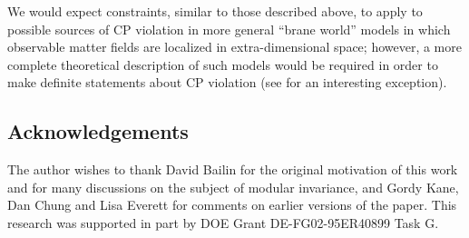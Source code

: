 \documentclass[a4paper,12pt]{article}
\begin{document}
We would expect constraints, similar to those described above, to apply to possible sources of CP violation in more general ``brane world'' models in which observable matter fields are localized in extra-dimensional space; however, a more complete theoretical description of such models would be required in order to make definite statements about CP violation (see \cite{Sakamura:2000ik} for an interesting exception).

\subsection*{Acknowledgements}
The author wishes to thank David Bailin for the original motivation of this work and for many discussions on the subject of modular invariance, and Gordy Kane, Dan Chung and Lisa Everett for comments on earlier versions of the paper. This research was supported in part by DOE Grant DE-FG02-95ER40899 Task G.
\end{document}
